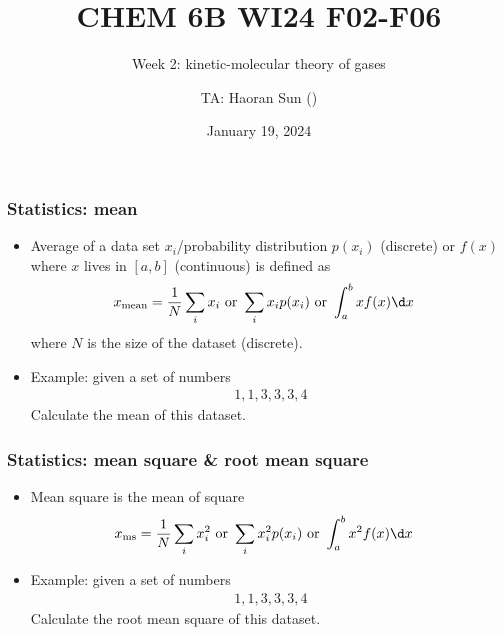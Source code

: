 \documentclass[aspectratio=169,xcolor={dvipsnames}]{beamer}
\title{CHEM 6B WI24 F02-F06}
\subtitle{Week 2: kinetic-molecular theory of gases}
\author{TA: Haoran Sun (\href{mailto:\mail}{\mail})}
\institute{University of California, San Diego}
\date{January 19, 2024}
\begin{document}
\maketitle



\begin{frame}[t]
    \frametitle{Statistics: mean}
    \begin{itemize}
        \item Average of a data set $x_i$/probability distribution $p(x_i)$
            (discrete) or $f(x)$ where
            $x$ lives in $[a, b]$ (continuous)
            is defined as 
            \begin{align}
                x_\text{mean} &= \frac{1}{N}\sum_i x_i \text{ or }
                \sum_i x_ip(x_i)\text{ or }
                \int_a^b xf(x)\d x
            \end{align}
            where $N$ is the size of the dataset (discrete).
        \item Example: given a set of numbers
            \begin{align*}
                1, 1, 3, 3, 3, 4
            \end{align*}
            Calculate the mean of this dataset.
    \end{itemize}
\end{frame}

\begin{frame}[t]
    \frametitle{Statistics: mean square \& root mean square}
    \begin{itemize}
        \item Mean square is the mean of square
            \begin{align}
                x_\text{ms} &= \frac{1}{N}\sum_i x_i^2 \text{ or }
                \sum_i x_i^2 p(x_i)\text{ or }
                \int_a^b x^2f(x)\d x
            \end{align}
        \item Example: given a set of numbers
            \begin{align*}
                1, 1, 3, 3, 3, 4
            \end{align*}
            Calculate the root mean square of this dataset.
    \end{itemize}
\end{frame}
\end{document}
